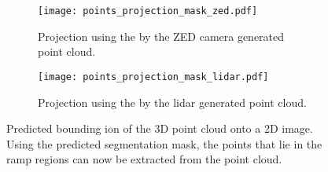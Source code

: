 \begin{figure}[htb]
	\centering
	\begin{subfigure}{1\textwidth}
		\centering
		\texttt{[image: points\_projection\_mask\_zed.pdf]}
		\caption{Projection using the by the ZED camera generated point cloud.}
		\label{fig:points_projection_mask_zed}
	\end{subfigure}
	
	\begin{subfigure}{1\textwidth}
		\centering
		\texttt{[image: points\_projection\_mask\_lidar.pdf]}
		\caption{Projection using the by the \acrshort{lidar} generated point cloud.}
		\label{fig:points_projection_mask_lidar}
	\end{subfigure}
	\caption[Point cloud extraction using the predicted segmentation mask]{Predicted bounding ion of the 3D point cloud onto a 2D image. Using the predicted segmentation mask, the points that lie in the ramp regions can now be extracted from the point cloud.}
\end{figure}
\begin{table}[H]
	\centering
	\caption[Ramp length]{Estimation of different ramp properties using the extracted point cloud.}
	\label{tab:cloud_extraction_estimation}
\end{table}